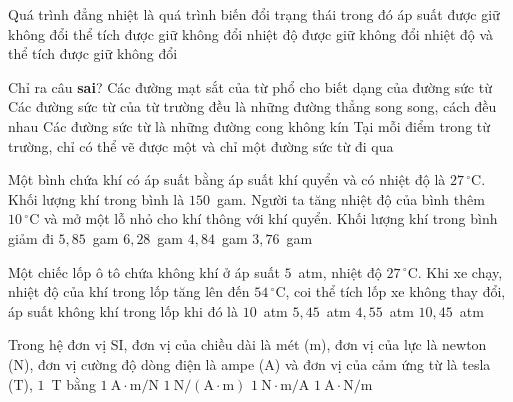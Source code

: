 	\begin{ex}%
		Quá trình đẳng nhiệt là quá trình biến đổi trạng thái trong đó
		\choice
		{áp suất được giữ không đổi}
		{thể tích được giữ không đổi}
		{\True nhiệt độ được giữ không đổi}
		{nhiệt độ và thể tích được giữ không đổi}
	\end{ex}

	\begin{ex}%
		Chỉ ra câu \textbf{sai}?
		\choice
		{Các đường mạt sắt của từ phổ cho biết dạng của đường sức từ}
		{Các đường sức từ của từ trường đều là những đường thẳng song song, cách đều nhau}
		{\True Các đường sức từ là những đường cong không kín}
		{Tại mỗi điểm trong từ trường, chỉ có thể vẽ được một và chỉ một đường sức từ đi qua}
	\end{ex}

	\begin{ex}%
		Một bình chứa khí có áp suất bằng áp suất khí quyển và có nhiệt độ là $27\,^\circ\text{C}$. Khối lượng khí trong bình là $150$~gam. Người ta tăng nhiệt độ của bình thêm $10\,^\circ\text{C}$ và mở một lỗ nhỏ cho khí thông với khí quyển. Khối lượng khí trong bình giảm đi
		\choice
		{$5{,}85$~gam}
		{$6{,}28$~gam}
		{\True $4{,}84$~gam}
		{$3{,}76$~gam}
	\end{ex}

	\begin{ex}%
		Một chiếc lốp ô tô chứa không khí ở áp suất $5$~atm, nhiệt độ $27\,^\circ\text{C}$. Khi xe chạy, nhiệt độ của khí trong lốp tăng lên đến $54\,^\circ\text{C}$, coi thể tích lốp xe không thay đổi, áp suất không khí trong lốp khi đó là
		\choice
		{$10$~atm}
		{\True $5{,}45$~atm}
		{$4{,}55$~atm}
		{$10{,}45$~atm}
	\end{ex}

	\begin{ex}%
		Trong hệ đơn vị SI, đơn vị của chiều dài là mét (m), đơn vị của lực là newton (N), đơn vị cường độ dòng điện là ampe (A) và đơn vị của cảm ứng từ là tesla (T), $1$~T bằng
		\choice
		{$1~\text{A}\cdot\text{m/N}$}
		{\True $1~\text{N}/(\text{A}\cdot\text{m})$}
		{$1~\text{N}\cdot\text{m/A}$}
		{$1~\text{A}\cdot\text{N/m}$}
	\end{ex}

